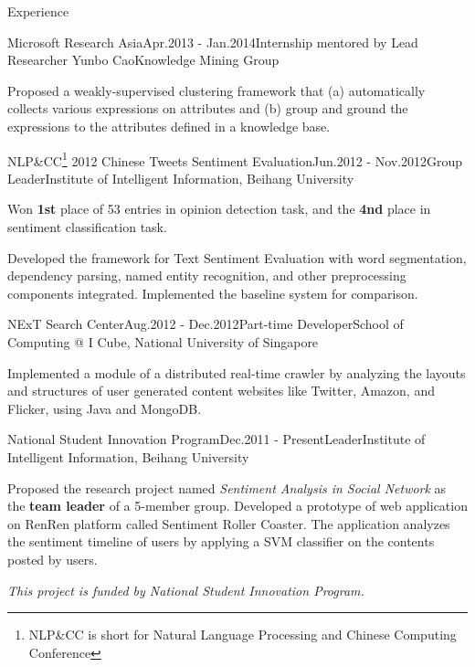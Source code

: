 \documentclass{resume} %
\begin{document}
\begin{rSection}{Experience}

\begin{rSubsection}{Microsoft Research Asia}{Apr.2013 - Jan.2014}{Internship mentored by Lead Researcher Yunbo Cao}{Knowledge Mining Group}
\item Proposed a weakly-supervised clustering framework that (a) automatically collects various expressions on attributes and (b) group and ground the expressions to the attributes defined in a knowledge base.
\end{rSubsection}

\begin{rSubsection}{NLP\&CC\footnote{NLP\&CC is short for Natural Language Processing and Chinese Computing Conference} 2012 Chinese Tweets Sentiment Evaluation}{Jun.2012 - Nov.2012}{Group Leader}{Institute of Intelligent Information, Beihang University}
\item Won \textbf{1st} place of 53 entries in opinion detection task, and the \textbf{4nd} place in sentiment classification task.
\item Developed the framework for Text Sentiment Evaluation with word segmentation, dependency parsing, named entity recognition, and other preprocessing components integrated.  Implemented the baseline system for comparison.
\end{rSubsection}


\begin{rSubsection}{NExT Search Center}{Aug.2012 - Dec.2012}{Part-time Developer}{School of Computing @ I Cube, National University of Singapore}
\item Implemented a module of a distributed real-time crawler by analyzing the layouts and structures of user generated content websites like Twitter, Amazon, and Flicker, using Java and MongoDB.
\end{rSubsection}


\begin{rSubsection}{National Student Innovation Program}{Dec.2011 - Present}{Leader}{Institute of Intelligent Information, Beihang University}
\item Proposed the research project named \emph {Sentiment Analysis in Social Network} as the \textbf{team leader} of a 5-member group.  Developed a prototype of web application on RenRen platform called Sentiment Roller Coaster.  The application analyzes the sentiment timeline of users by applying a SVM classifier on the contents posted by users.
\item {\em This project is funded by National Student Innovation Program.}
\end{rSubsection}


\end{rSection}
\end{document}
